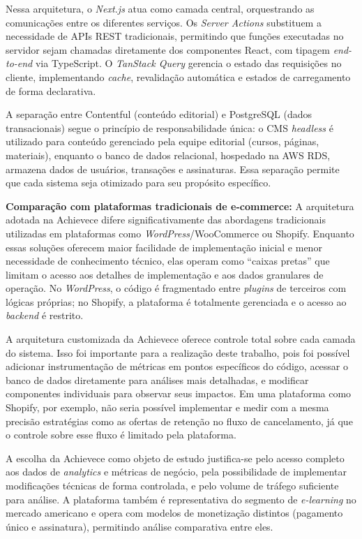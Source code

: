 Nessa arquitetura, o \textit{Next.js} atua como camada central, orquestrando as comunicações entre os diferentes serviços. Os \textit{Server Actions} substituem a necessidade de APIs REST tradicionais, permitindo que funções executadas no servidor sejam chamadas diretamente dos componentes React, com tipagem \textit{end-to-end} via TypeScript. O \textit{TanStack Query} gerencia o estado das requisições no cliente, implementando \textit{cache}, revalidação automática e estados de carregamento de forma declarativa.

A separação entre Contentful (conteúdo editorial) e PostgreSQL (dados transacionais) segue o princípio de responsabilidade única: o CMS \textit{headless} é utilizado para conteúdo gerenciado pela equipe editorial (cursos, páginas, materiais), enquanto o banco de dados relacional, hospedado na AWS RDS, armazena dados de usuários, transações e assinaturas. Essa separação permite que cada sistema seja otimizado para seu propósito específico.

\textbf{Comparação com plataformas tradicionais de e-commerce:} A arquitetura adotada na Achievece difere significativamente das abordagens tradicionais utilizadas em plataformas como \textit{WordPress}/WooCommerce ou Shopify. Enquanto essas soluções oferecem maior facilidade de implementação inicial e menor necessidade de conhecimento técnico, elas operam como ``caixas pretas'' que limitam o acesso aos detalhes de implementação e aos dados granulares de operação. No \textit{WordPress}, o código é fragmentado entre \textit{plugins} de terceiros com lógicas próprias; no Shopify, a plataforma é totalmente gerenciada e o acesso ao \textit{backend} é restrito.

A arquitetura customizada da Achievece oferece controle total sobre cada camada do sistema. Isso foi importante para a realização deste trabalho, pois foi possível adicionar instrumentação de métricas em pontos específicos do código, acessar o banco de dados diretamente para análises mais detalhadas, e modificar componentes individuais para observar seus impactos. Em uma plataforma como Shopify, por exemplo, não seria possível implementar e medir com a mesma precisão estratégias como as ofertas de retenção no fluxo de cancelamento, já que o controle sobre esse fluxo é limitado pela plataforma.

A escolha da Achievece como objeto de estudo justifica-se pelo acesso completo aos dados de \textit{analytics} e métricas de negócio, pela possibilidade de implementar modificações técnicas de forma controlada, e pelo volume de tráfego suficiente para análise. A plataforma também é representativa do segmento de \textit{e-learning} no mercado americano e opera com modelos de monetização distintos (pagamento único e assinatura), permitindo análise comparativa entre eles.

